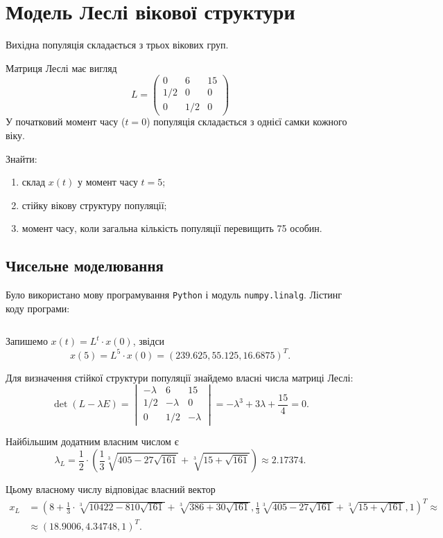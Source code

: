 \section{Модель Леслі вікової структури}

Вихідна популяція складається з трьох вікових груп. \medskip

Матриця Леслі має вигляд \[ L = \begin{pmatrix} 0 & 6 & 15 \\ 1/2 & 0 & 0 \\ 0 & 1/2 & 0 \end{pmatrix} \] У початковий момент часу ($t = 0$) популяція складається з однієї самки кожного віку. \medskip

Знайти:
\begin{enumerate}
	\item склад $x(t)$ у момент часу $t = 5$;
	\item стійку вікову структуру популяції;
	\item момент часу, коли загальна кількість популяції перевищить 75 особин.
\end{enumerate}

\subsection{Чисельне моделювання}

Було використано мову програмування \texttt{Python} і модуль \texttt{numpy.linalg}. Лістинг коду програми:
\inputminted{python}{../py/2.py}

Запишемо $x(t) = L^t \cdot x(0)$, звідси \[ x(5) = L^5 \cdot x(0) = (239.625, 55.125, 16.6875)^T. \]

Для визначення стійкої структури популяції знайдемо власні числа матриці Леслі: \[ \det (L - \lambda E) = \begin{vmatrix} -\lambda & 6 & 15 \\ 1 / 2 & -\lambda & 0 \\ 0 & 1 / 2 & -\lambda \end{vmatrix} = - \lambda^3 + 3 \lambda + \frac{15}{4} = 0. \]

Найбільшим додатним власним числом є \[ \lambda_L = \frac{1}{2} \cdot \left( \frac{1}{3} \sqrt[3]{405 - 27 \sqrt{161}} + \sqrt[3]{15 + \sqrt{161}} \right) \approx 2.17374. \]

Цьому власному числу відповідає власний вектор \begin{align*} x_L &= \left( 8 + \frac{1}{3} \cdot \sqrt[3]{10422 - 810\sqrt{161}} + \sqrt[3]{386 + 30 \sqrt{161}}, \frac{1}{3} \sqrt[3]{405 - 27 \sqrt{161}}+ \sqrt[3]{15 + \sqrt{161}}, 1 \right)^T \approx \\ &\approx (18.9006, 4.34748, 1)^T. \end{align*}

